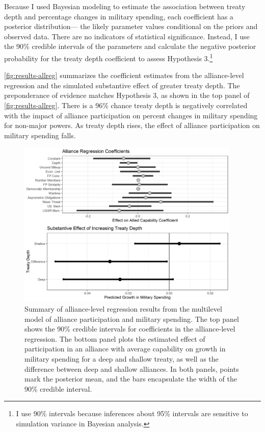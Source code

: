 \documentclass[12pt]{article}
\begin{document}
Because I used Bayesian modeling to estimate the association between treaty depth and percentage changes in military spending, each coefficient has a posterior distribution--- the likely parameter values conditional on the priors and observed data.
There are no indicators of statistical significance. 
Instead, I use the 90\% credible intervals of the parameters and calculate the negative posterior probability for the treaty depth coefficient to assess Hypothesis 3.\footnote{I use 90\% intervals because inferences about 95\% intervals are sensitive to simulation variance in Bayesian analysis.}


\autoref{fig:results-allreg} summarizes the coefficient estimates from the alliance-level regression and the simulated substantive effect of greater treaty depth. 
The preponderance of evidence matches Hypothesis 3, as shown in the top panel of \autoref{fig:results-allreg}.
There is a 96\% chance treaty depth is negatively correlated with the impact of alliance participation on percent changes in military spending for non-major powers.
As treaty depth rises, the effect of alliance participation on military spending falls. 


\begin{figure}[htbp]
	\centering
		\includegraphics[width=0.95\textwidth]{../figures/results-allreg.png}
	\caption{Summary of alliance-level regression results from the multilevel model of alliance participation and military spending. The top panel shows the 90\% credible intervals for coefficients in the alliance-level regression. The bottom panel plots the estimated effect of participation in an alliance with average capability on growth in military spending for a deep and shallow treaty, as well as the difference between deep and shallow alliances. In both panels, points mark the posterior mean, and the bars encapsulate the width of the 90\% credible interval.}
	\label{fig:results-allreg}
\end{figure}
\end{document}
